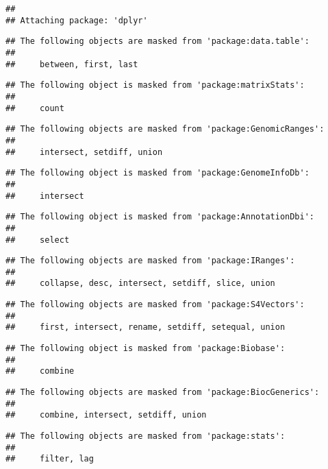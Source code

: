 \documentclass[
]{article}
\begin{document}
\begin{verbatim}
## 
## Attaching package: 'dplyr'
\end{verbatim}

\begin{verbatim}
## The following objects are masked from 'package:data.table':
## 
##     between, first, last
\end{verbatim}

\begin{verbatim}
## The following object is masked from 'package:matrixStats':
## 
##     count
\end{verbatim}

\begin{verbatim}
## The following objects are masked from 'package:GenomicRanges':
## 
##     intersect, setdiff, union
\end{verbatim}

\begin{verbatim}
## The following object is masked from 'package:GenomeInfoDb':
## 
##     intersect
\end{verbatim}

\begin{verbatim}
## The following object is masked from 'package:AnnotationDbi':
## 
##     select
\end{verbatim}

\begin{verbatim}
## The following objects are masked from 'package:IRanges':
## 
##     collapse, desc, intersect, setdiff, slice, union
\end{verbatim}

\begin{verbatim}
## The following objects are masked from 'package:S4Vectors':
## 
##     first, intersect, rename, setdiff, setequal, union
\end{verbatim}

\begin{verbatim}
## The following object is masked from 'package:Biobase':
## 
##     combine
\end{verbatim}

\begin{verbatim}
## The following objects are masked from 'package:BiocGenerics':
## 
##     combine, intersect, setdiff, union
\end{verbatim}

\begin{verbatim}
## The following objects are masked from 'package:stats':
## 
##     filter, lag
\end{verbatim}
\end{document}
